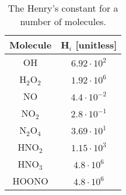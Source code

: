     \begin{table}[htpb] %
        \begin{center}
            \begin{tabular}{c |c }\rmfamily
                Molecule & H$_i$ [unitless] \\ \hline \hline
                OH & $6.92\cdot10^2$\\
                H$_2$O$_2$ & $1.92\cdot10^6$\\
                NO & $4.4\cdot10^{-2}$\\
                NO$_2$ & $2.8\cdot10^{-1}$\\
                N$_2$O$_4$ & $3.69\cdot10^1$\\
                HNO$_2$ & $1.15\cdot10^3$\\
                HNO$_3$ & $4.8\cdot10^6$\\
                HOONO & $4.8\cdot10^6$\\
            \end{tabular}
    \end{center}
        \caption{The Henry's constant for a number of molecules\cite{Tian2014}.}
        \label{tab:henryconstants}
    \end{table}


